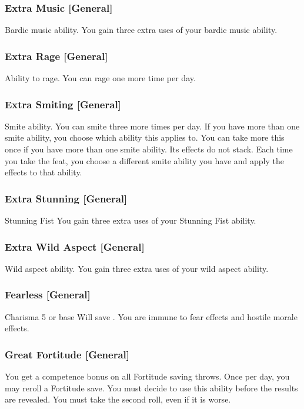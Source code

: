 \subsubsection{Extra Music [General]}
 Bardic music ability.
 You gain three extra uses of your bardic music ability.

\subsubsection{Extra Rage [General]}
 Ability to rage.
 You can rage one more time per day.

\subsubsection{Extra Smiting [General]}
 Smite ability.
 You can smite three more times per day. If you have more than one smite ability, you choose which ability this applies to.
 You can take more this once if you have more than one smite ability. Its effects do not stack. Each time you take the feat, you choose a different smite ability you have and apply the effects to that ability.

\subsubsection{Extra Stunning [General]}
 Stunning Fist
 You gain three extra uses of your Stunning Fist ability.

\subsubsection{Extra Wild Aspect [General]}
 Wild aspect ability.
 You gain three extra uses of your wild aspect ability.

\subsubsection{Fearless [General]}
\featpre Charisma 5 or base Will save .
\featben You are immune to fear effects and hostile morale effects.

\subsubsection{Great Fortitude [General]}
 You get a  competence bonus on all Fortitude saving throws. Once per day, you may reroll a Fortitude save. You must decide to use this ability before the results are revealed. You must take the second roll, even if it is worse.

